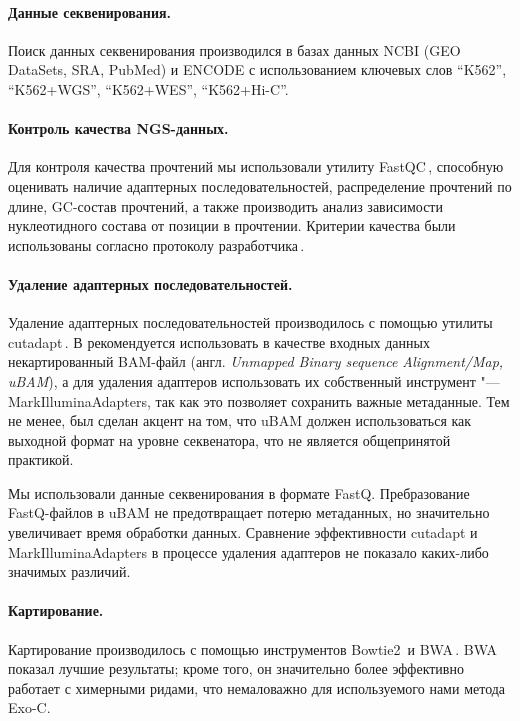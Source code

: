 \documentclass[a4paper,14pt]{extarticle}
\newcommand{\utilname}[1]{\textenglish{#1}}
\newcommand{\engterm}[1]{англ. \textenglish{\textit{#1}}}
\begin{document}
\paragraph{Данные секвенирования.}
Поиск данных секвенирования производился в базах данных NCBI (GEO DataSets, SRA, PubMed) и ENCODE с использованием ключевых слов ``K562'', ``K562+WGS'', ``K562+WES'', ``K562+Hi-C''.

\paragraph{Контроль качества NGS\hyp{}данных.}
Для контроля качества прочтений мы использовали утилиту \utilname{FastQC}\,\citep{FastQC}, способную оценивать наличие адаптерных последовательностей, распределение прочтений по длине, GC-состав прочтений, а также производить анализ зависимости нуклеотидного состава от позиции в прочтении.
Критерии качества были использованы согласно протоколу разработчика\,\citep{FastQC}.

\paragraph{Удаление адаптерных последовательностей.}
Удаление адаптерных последовательностей производилось с помощью утилиты \utilname{cutadapt}\,\citep{Martin_2011}.
В \citet{Auwera_2013} рекомендуется использовать в качестве входных данных некартированный BAM-файл (\engterm{Unmapped Binary sequence Alignment/Map, uBAM}), а для удаления адаптеров использовать их собственный инструмент "--- \utilname{MarkIlluminaAdapters}, так как это позволяет сохранить важные метаданные.
Тем не менее, был сделан акцент на том, что uBAM должен использоваться как выходной формат на уровне секвенатора, что не является общепринятой практикой.

Мы использовали данные секвенирования в формате FastQ.
Пребразование FastQ-файлов в uBAM не предотвращает потерю метаданных, но значительно увеличивает время обработки данных.
Сравнение эффективности \utilname{cutadapt} и \utilname{MarkIlluminaAdapters} в процессе удаления адаптеров не показало каких-либо значимых различий.

\paragraph{Картирование.}
Картирование производилось с помощью инструментов \utilname{Bowtie2}\,\citep{Langmead_2012} и \utilname{BWA}\,\citep{Li_2009}.
\utilname{BWA} показал лучшие результаты;
кроме того, он значительно более эффективно работает с химерными ридами, что немаловажно для используемого нами метода Exo-C.
\end{document}
